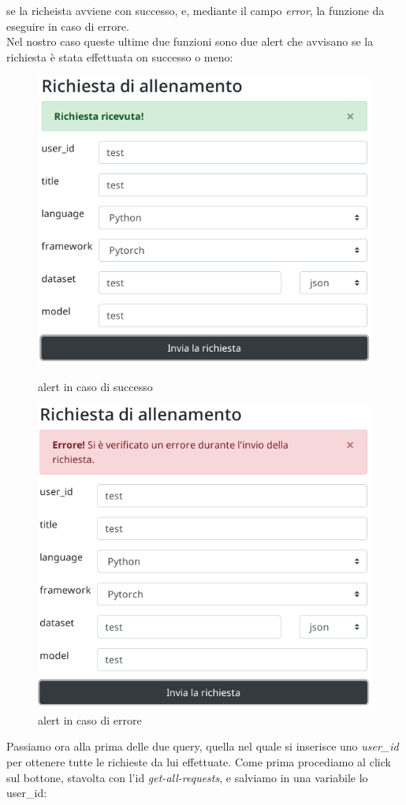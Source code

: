 \documentclass[a4paper,12pt, oneside]{book}
\begin{document}
se la richeista avviene con successo, e, mediante il campo \textit{error}, la funzione da eseguire in caso di errore.\\
Nel nostro caso queste ultime due funzioni sono due alert che avvisano se la richiesta è stata effettuata on successo o meno:
\begin{figure}[H]
\centering
\begin{minipage}{.5\textwidth}
  \centering
  \includegraphics[scale = 0.42]{img/good-form.png}
  \caption{alert in caso di successo}
\end{minipage}%
\begin{minipage}{.5\textwidth}
  \centering
  \includegraphics[scale = 0.4]{img/bad-form.png}
  \caption{alert in caso di errore}
\end{minipage}
\end{figure}
Passiamo ora alla prima delle due query, quella nel quale si inserisce uno \textit{user\_id} per ottenere tutte le richieste da lui effettuate. Come prima procediamo al click sul bottone, stavolta con l'id \textit{get-all-requests}, e salviamo in una variabile lo user_id:
\end{document}
